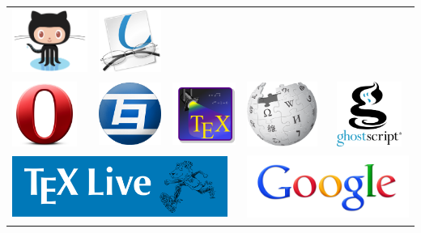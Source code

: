 \begin{tabular}{lllll}
\href{https://github.com/}{\includegraphics[height=80px]{img/thanks/octocat.png}} &
\href{http://okular.kde.org/}{\includegraphics[height=80px]{img/thanks/okular.png}} \\

\href{http://www.opera.com/}{\includegraphics[height=80px]{img/thanks/opera.png}} &
\href{http://www.tagaini.net/}{\includegraphics[height=80px]{img/thanks/tagainijisho.png}} &
\href{http://texstudio.sourceforge.net/}{\includegraphics[height=80px]{img/thanks/texstudio.png}} &
\href{http://www.wikipedia.org/}{\includegraphics[height=80px]{img/thanks/wikipedia.png}} &
\href{http://www.ghostscript.com/}{\includegraphics[height=80px]{img/thanks/ghostscript.png}} \\

\multicolumn{3}{l}{\href{http://www.tug.org/texlive/}{\includegraphics[height=75px]{img/thanks/texlive.png}}} &
\multicolumn{2}{l}{\href{http://www.google.com/}{\includegraphics[height=80px]{img/thanks/google.png}}} \\
\end{tabular}


